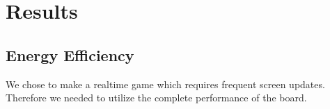 \chapter{Results}

\section{Energy Efficiency}
We chose to make a realtime game which requires frequent screen updates. Therefore we needed to utilize the complete performance of the board. 